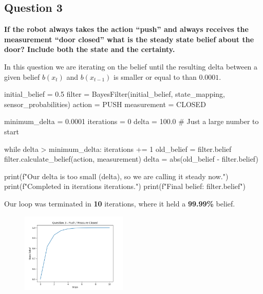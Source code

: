 \documentclass{article}
\begin{document}
\subsection*{Question 3}
\textbf{If the robot always takes the action “push” and always receives the measurement “door closed” what is the steady state belief about the door? Include both the state and the certainty.}

In this question we are iterating on the belief until the resulting delta between a given belief $b(x_t)$ and $b(x_{t-1})$ is smaller or equal to than $0.0001$.

\begin{python}
    initial_belief = 0.5
    filter = BayesFilter(initial_belief, state_mapping, sensor_probabilities)
    action = PUSH
    measurement = CLOSED

    minimum_delta = 0.0001
    iterations = 0
    delta = 100.0  # Just a large number to start

    while delta > minimum_delta:
    iterations += 1
    old_belief = filter.belief
    filter.calculate_belief(action, measurement)
    delta = abs(old_belief - filter.belief)

    print(f"Our delta is too small ({delta}), so we are calling it steady now.")
    print(f"Completed in {iterations} iterations.")
    print(f"Final belief: {filter.belief}")
\end{python}

Our loop was terminated in \textbf{10} iterations, where it held a \textbf{99.99\%} belief.

\begin{figure}[H]
    \centering
    \includegraphics[width = 0.45\textwidth]{q3.png}
\end{figure}
\end{document}
